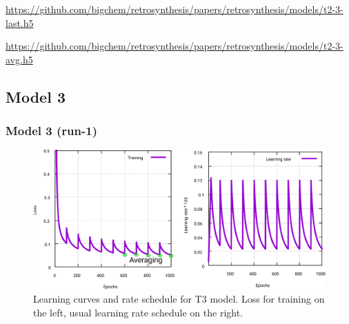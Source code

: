 \documentclass{article}
\begin{document}
\url{https://github.com/bigchem/retrosynthesis/papers/retrosynthesis/models/t2-3-last.h5}

\url{https://github.com/bigchem/retrosynthesis/papers/retrosynthesis/models/t2-3-avg.h5}
 
 \newpage

 \subsection{Model 3}
 
 \subsubsection{Model 3 (run-1)}
 
\begin{figure}[h!]
  \centering
  \includegraphics[width = 16.5cm]{images/t3-1.pdf}
  \caption{Learning curves and rate schedule for T3 model. Loss for training on the left, usual learning rate schedule on the right.}
  \label{fig:t11}
\end{figure}
\end{document}
